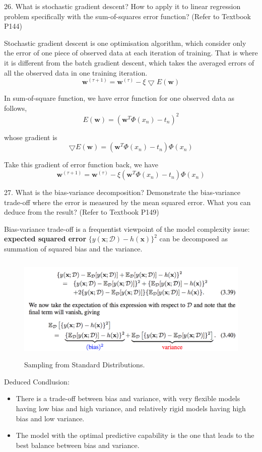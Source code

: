 \documentclass[11pt,a4paper]{article}
\newcommand{\bs}[1]{\boldsymbol{#1}}
\begin{document}
    26. What is stochastic gradient descent? How to apply it to linear regression problem specifically with the sum-of-squares error function? (Refer to Textbook P144)

    Stochastic gradient descent is one optimisation algorithm, which consider only the error of one piece of observed data at each iteration of training. That is where it is different from the batch gradient descent, which takes the averaged errors of all the observed data in one training iteration.
    $$ \bs{w}^{(\tau+1)} = \bs{w}^{(\tau)} - \xi \bigtriangledown E(\bs{w}) $$

    In sum-of-square function, we have error function for one observed data as follows,
    $$ E(\bs{w}) = ( \bs{w}^T \Phi(x_n) - t_n)^2 $$
    
    whose gradient is 
    $$ \bigtriangledown E(\bs{w}) = (\bs{w}^T \Phi(x_n) - t_n) \Phi(x_n)$$
    
    Take this gradient of error function back, we have
    $$ \bs{w}^{(\tau+1)} = \bs{w}^{(\tau)} - \xi (\bs{w}^T \Phi(x_n) - t_n) \Phi(x_n) $$

27. What is the bias-variance decomposition? Demonstrate the bias-variance trade-off where the error is measured by the mean squared error. What you can deduce from the result? (Refer to Textbook P149)
    
Bias-variance trade-off is a frequentist viewpoint of the model complexity issue: \textbf{expected squared error} $\{ y(\bs{x} ; \mathcal{D}) - h(\bs{x}) \}^2$ can be decomposed as summation of squared bias and the variance.

\begin{figure}[H] \centering
    \includegraphics[width=5.5in,height=2in]{./figure/BVtradeoff.png}
    \caption{Sampling from Standard Distributions.}
\end{figure}

Deduced Condlusion: 

\begin{itemize}
    \item There is a trade-off between bias and variance, with very flexible models having low bias and high variance, and relatively rigid models having high bias and low variance.
    \item The model with the optimal predictive capability is the one that leads to the best balance between bias and variance. 
\end{itemize}
\end{document}
